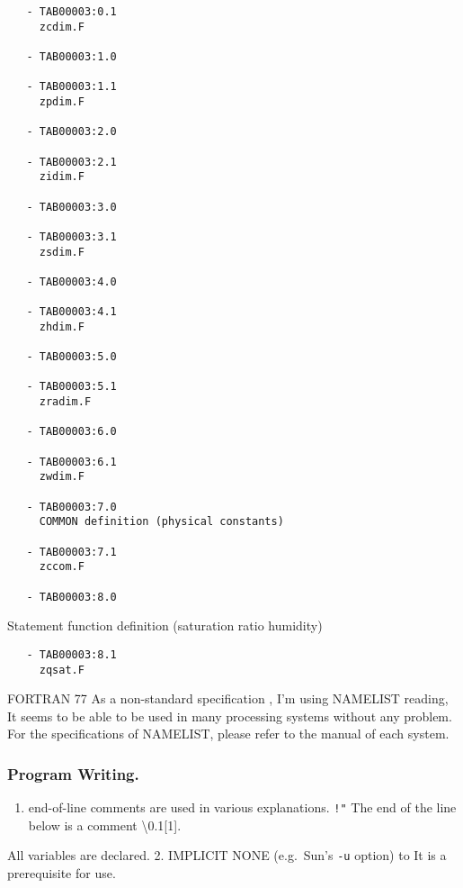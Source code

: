 \begin{verbatim}
   - TAB00003:0.1 
     zcdim.F
 
   - TAB00003:1.0
 
   - TAB00003:1.1 
     zpdim.F
 
   - TAB00003:2.0
 
   - TAB00003:2.1 
     zidim.F
 
   - TAB00003:3.0
 
   - TAB00003:3.1 
     zsdim.F
 
   - TAB00003:4.0
 
   - TAB00003:4.1 
     zhdim.F
 
   - TAB00003:5.0
 
   - TAB00003:5.1 
     zradim.F
 
   - TAB00003:6.0
 
   - TAB00003:6.1 
     zwdim.F
 
   - TAB00003:7.0 
     COMMON definition (physical constants)
 
   - TAB00003:7.1 
     zccom.F
 
   - TAB00003:8.0 
\end{verbatim}

Statement function definition (saturation ratio humidity)

\begin{verbatim}
   - TAB00003:8.1 
     zqsat.F
\end{verbatim}

FORTRAN 77 As a non-standard specification , I'm using NAMELIST reading,
It seems to be able to be used in many processing systems without any
problem. For the specifications of NAMELIST, please refer to the manual
of each system.

\hypertarget{program-writing.}{%
\subsubsection{Program Writing.}\label{program-writing.}}

\begin{enumerate}
\def\labelenumi{\arabic{enumi}.}
\tightlist
\item
  end-of-line comments are used in various explanations. \texttt{!"} The
  end of the line below is a comment \textbackslash0.1{[}1{]}.
\end{enumerate}

All variables are declared. 2. IMPLICIT NONE (e.g.~Sun's {\texttt{-u}}
option) to It is a prerequisite for use.

